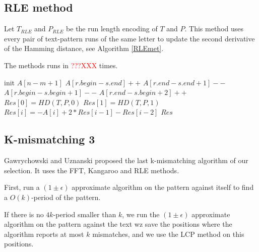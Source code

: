 \documentclass[preprint,12pt]{elsarticle}
\begin{document}








\subsection{RLE method}

Let $T_{RLE}$ and $P_{RLE}$ be the run length encoding of $T$ and $P$.
This method uses every pair of text-pattern runs of the same letter
to update the second derivative of the Hamming distance,
see Algorithm \ref{RLEmet}.

The methods runs in \textcolor{red}{???XXX} times.


\begin{algorithm}
\label{RLEmet}
\caption{$K\_mism\_1(T, P, k)$}
\begin{algorithmic}

\STATE init $A[n-m+1]$
			\STATE $A[r.begin - s.end] ++$
			\STATE $A[r.end-s.end+1] --$
			\STATE $A[r.begin - s.begin+1]--$
			\STATE $A[r.end - s.begin +2] ++$
		\ENDIF
	\ENDFOR
\ENDFOR
\STATE $Res[0] = HD(T, P, 0)$
\STATE $Res[1] = HD(T, P, 1)$
	\STATE $Res[i] = -A[i] + 2 * Res[i-1] - Res[i-2]$
\ENDFOR
\RETURN $Res$

\end{algorithmic}
\end{algorithm}






\subsection{K-mismatching 3}
Gawrychowski and Uznanski\cite{Kmism3} proposed the last k-mismatching algorithm of our selection.
It uses the FFT, Kangaroo and RLE methods. 

First, run a $(1 \pm \epsilon)$ approximate algorithm on the pattern against itself
to find a $O(k)$-period of the pattern.

If there is no $4k$-period smaller than $k$,
we run the $(1 \pm \epsilon)$ approximate algorithm on the pattern against the text
wz save the positions where the algorithm reports at most $k$ mismatches,
and we use the LCP method on this positions. 
\end{document}
